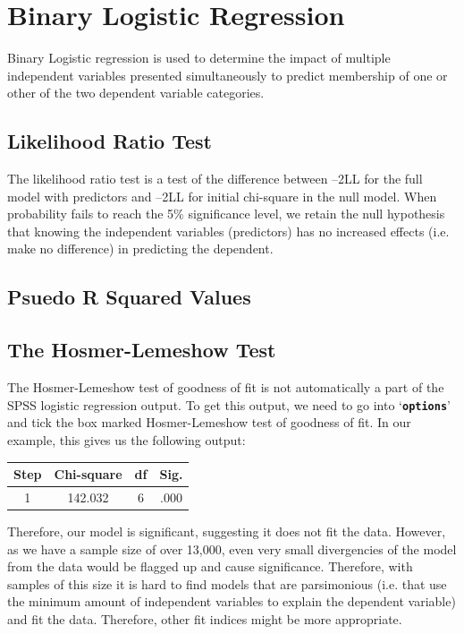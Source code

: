 \documentclass[a4paper,12pt]{article}
\begin{document}
	\Large


\section{Binary Logistic Regression}
Binary Logistic regression is used to determine the impact of multiple independent variables
presented simultaneously to predict membership of one or other of the two
dependent variable categories.

\subsection{Likelihood Ratio Test}
The likelihood ratio test is a test of the difference between –2LL for the full
model with predictors and –2LL for initial chi-square in the null model.
When probability fails to reach the 5\% significance level, we retain the null hypothesis
that knowing the independent variables (predictors) has no increased effects (i.e. make no
difference) in predicting the dependent.

\subsection{Psuedo R Squared Values}


\subsection{The Hosmer-Lemeshow Test}

The Hosmer-Lemeshow test of goodness of fit is not automatically a part of the SPSS logistic regression output. To get this output, we need to go into `\textbf{\texttt{options}}’ and tick the box marked Hosmer-Lemeshow test of goodness of fit. In our example, this gives us the following output:

\begin{tabular}{|c|c|c|c|}
\hline  Step	& Chi-square&	df 	 & Sig. \\ \hline
 1	 & 142.032	& 6	 &.000 \\ 
\hline 
\end{tabular} 

Therefore, our model is significant, suggesting it does not fit the data. However, as we have a sample size of over 13,000, even very small divergencies of the model from the data would be flagged up and cause significance. Therefore, with samples of this size it is hard to find models that are parsimonious (i.e. that use the minimum amount of independent variables to explain the dependent variable) and fit the data. Therefore, other fit indices might be more appropriate.
\end{document}
